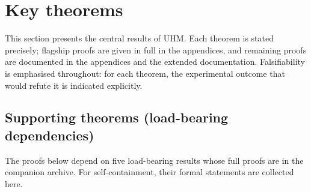 
\section{Key theorems}
\label{sec:theorems}

This section presents the central results of UHM. Each theorem is stated
precisely; flagship proofs are given in full in the appendices, and remaining
proofs are documented in the appendices and the extended documentation. Falsifiability is emphasised
throughout: for each theorem, the experimental outcome that would refute it
is indicated explicitly.

\subsection{Supporting theorems (load-bearing dependencies)}
\label{subsec:supporting-theorems}

The proofs below depend on five load-bearing results whose full proofs
are in the companion archive. For self-containment, their formal
statements are collected here.

